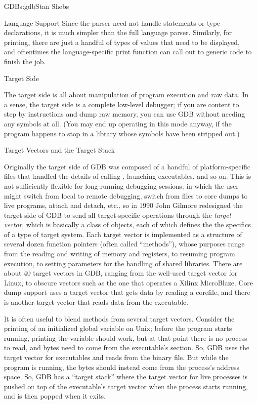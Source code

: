 \begin{aosachapter}{GDB}{s:gdb}{Stan Shebs}
\begin{aosasect2}{Language Support}
Since the parser need not handle statements or type
declarations, it is much simpler than the full language parser.  
Similarly, for printing, there are just a handful of types of values
that need to be displayed, and oftentimes the language-specific print
function can call out to generic code to finish the job.

\end{aosasect2}

\begin{aosasect1}{Target Side}

The target side is all about manipulation of program execution and raw data.
In a sense, the target side is a complete low-level debugger; if you
are content to step by instructions and dump raw memory, you can use
GDB without needing any symbols at all.  (You may end up operating in
this mode anyway, if the program happens to stop in a library whose
symbols have been stripped out.)

\begin{aosasect2}{Target Vectors and the Target Stack}

Originally the target side of GDB was composed of a handful of
platform-specific files that handled the details of calling
, launching executables, and so on.  This is not sufficiently flexible for long-running debugging sessions,
in which the user might switch from local to remote debugging, switch
from files to core dumps to live programs, attach and detach, etc., so in 1990 John Gilmore redesigned the target side of GDB to send all
target-specific operations through the {\em target vector}, which is
basically a class of objects, each of which defines the the specifics
of a type of target system.  Each target vector is implemented as a
structure of several dozen function pointers (often called
``methods''), whose purposes range from the reading and writing of
memory and registers, to resuming program execution, to setting
parameters for the handling of shared libraries.  There are about 40
target vectors in GDB, ranging from the well-used target vector for
Linux, to obscure vectors such as the one that operates a Xilinx
MicroBlaze.  Core dump support uses a target vector that gets data by
reading a corefile, and there is another target vector that reads data
from the executable.

It is often useful to blend methods from several target vectors.
Consider the printing of an initialized global variable on Unix;
before the program starts running, printing the variable should work,
but at that point there is no process to read, and bytes need to come
from the executable's  section.  So, GDB uses the target
vector for executables and reads from the binary file.  But while the
program is running, the bytes should instead come from the process's
address space.  So, GDB has a ``target stack'' where the target vector
for live processes is pushed on top of the executable's target vector
when the process starts running, and is then popped when it exits.


\end{aosasect2}
\end{aosasect1}
\end{aosachapter}
